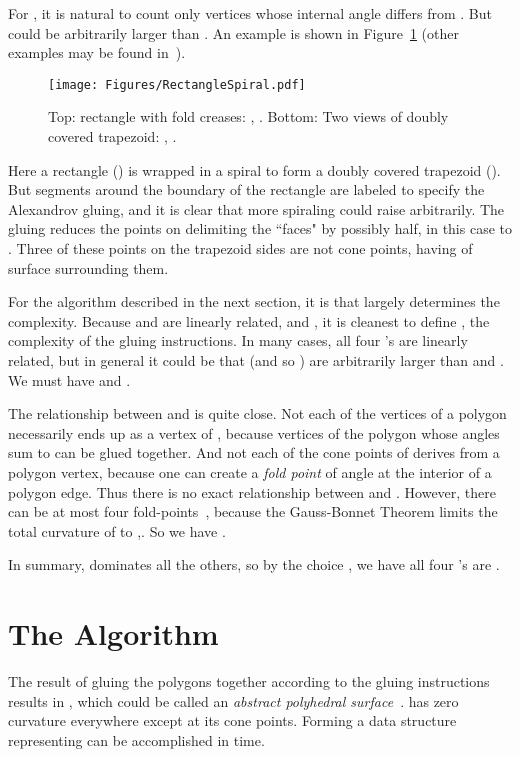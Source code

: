 \pdfoutput=1  \documentclass[]{article}
\newcommand{\figlab}[1]{\label{fig:#1}}
\newcommand{\seclab}[1]{\label{sec:#1}}
\newcommand{\figref}[1]{\ref{fig:#1}}
\begin{document}
For , it is natural to count only vertices whose internal angle differs from .
But  could be arbitrarily larger than .
An example is shown in 
Figure~\figref{RectangleSpiral} (other examples may be found in~\cite{addmru-cdsdob-11}).
\begin{figure}[htbp]
\centering
\texttt{[image: Figures/RectangleSpiral.pdf]}
\caption{Top: rectangle with fold creases: , .
Bottom: Two views of doubly covered trapezoid: , .}
\figlab{RectangleSpiral}
\end{figure}
Here a rectangle () is wrapped in a spiral to form a doubly covered trapezoid ().
But  segments around the boundary of the rectangle are labeled to specify
the Alexandrov gluing, and it is clear that more spiraling could raise  arbitrarily.
The gluing reduces the points on  delimiting the ``faces" by possibly half,
in this case to . Three of these points on the trapezoid sides are not
cone points, having  of surface surrounding them.

For the algorithm described in the next section, it is  that largely determines the complexity.
Because  and  are linearly related, and , it is cleanest to define ,
the complexity of the gluing instructions.
In many cases, all four 's are linearly related, but in general
it could be that  (and so ) are arbitrarily larger than  and .
We must have  and .

The relationship between  and  is quite close.
Not each of the  vertices of a polygon
necessarily ends up as a vertex of , because
vertices of the polygon whose angles sum
to  can be glued together.
And 
not each of the  cone points of  derives from
a polygon vertex, because
one can create a \emph{fold point} of angle  at the interior
of a polygon edge.
Thus there is no exact relationship between  and
.
However, there can be at most four
fold-points~\cite[Lem.~25.3.1]{do-gfalop-07},
because the Gauss-Bonnet Theorem limits the total curvature of 
to ,. So we have .

In summary,  dominates all the others, so by the choice ,
we have all four 's are .

\section{The Algorithm}
\seclab{Algorithm}
The result of gluing the polygons together according to the gluing instructions
results in , which
could be called an \emph{abstract polyhedral surface}~\cite[Ex.~39.11]{p-ldpg-10}.
 has zero curvature everywhere except at its cone points.
Forming a data structure representing  can be accomplished in  time.
\end{document}
